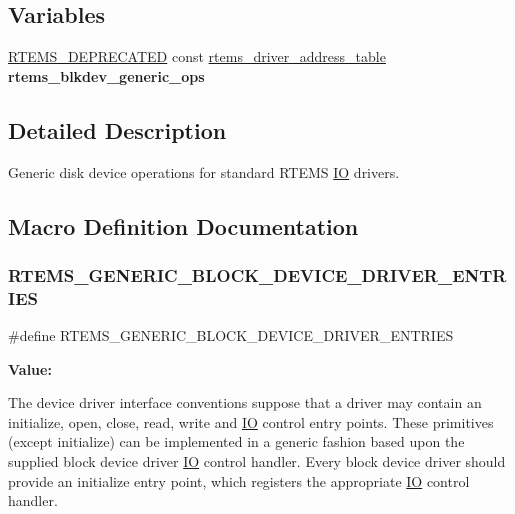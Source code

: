 \subsection*{Variables}
\begin{DoxyCompactItemize}
\item 
\mbox{\label{group__rtems__blkdev__generic_ga4971234b9823b56115f309958e1be886}} 
\mbox{\hyperlink{group__RTEMSScoreBaseDefs_gab651a076d4d51d50221e7ef7ac99d4e7}{R\+T\+E\+M\+S\+\_\+\+D\+E\+P\+R\+E\+C\+A\+T\+ED}} const \mbox{\hyperlink{structrtems__driver__address__table}{rtems\+\_\+driver\+\_\+address\+\_\+table}} {\bfseries rtems\+\_\+blkdev\+\_\+generic\+\_\+ops}
\end{DoxyCompactItemize}


\subsection{Detailed Description}
Generic disk device operations for standard R\+T\+E\+MS \mbox{\hyperlink{structIO}{IO}} drivers. 

\subsection{Macro Definition Documentation}
\mbox{\label{group__rtems__blkdev__generic_gab2d9149dc532657053697e5010fffa82}} 
\subsubsection{\texorpdfstring{RTEMS\_GENERIC\_BLOCK\_DEVICE\_DRIVER\_ENTRIES}{RTEMS\_GENERIC\_BLOCK\_DEVICE\_DRIVER\_ENTRIES}}
{\footnotesize\ttfamily \#define R\+T\+E\+M\+S\+\_\+\+G\+E\+N\+E\+R\+I\+C\+\_\+\+B\+L\+O\+C\+K\+\_\+\+D\+E\+V\+I\+C\+E\+\_\+\+D\+R\+I\+V\+E\+R\+\_\+\+E\+N\+T\+R\+I\+ES}

{\bfseries Value\+:}
\begin{DoxyCode}{0}

\end{DoxyCode}
The device driver interface conventions suppose that a driver may contain an initialize, open, close, read, write and \mbox{\hyperlink{structIO}{IO}} control entry points. These primitives (except initialize) can be implemented in a generic fashion based upon the supplied block device driver \mbox{\hyperlink{structIO}{IO}} control handler. Every block device driver should provide an initialize entry point, which registers the appropriate \mbox{\hyperlink{structIO}{IO}} control handler. 